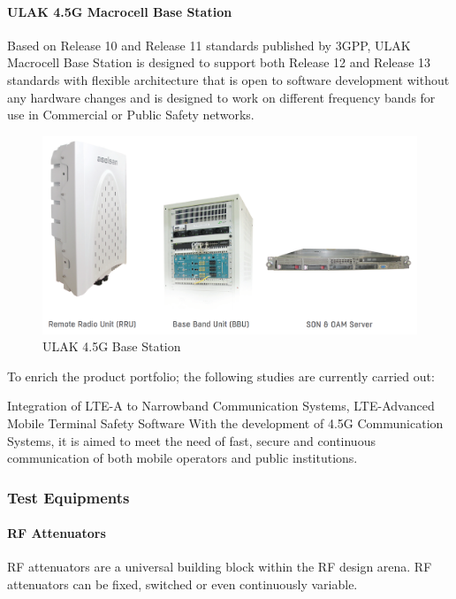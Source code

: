 \paragraph{ULAK 4.5G Macrocell Base Station}
\- \indent
	Based on Release 10 and Release 11 standards published by 3GPP, ULAK Macrocell Base Station is designed to support both Release 12 and Release 13 standards with flexible architecture that is open to software development without any hardware changes and is designed to work on different frequency bands for use in Commercial or Public Safety networks.  

\begin{figure}[H]
	\center
	\setlength{\unitlength}{\textwidth} 
	\includegraphics[width=1.0\unitlength]{ulak}
	\caption{\label{fig:ulak}ULAK 4.5G Base Station }
\end{figure}	
	
	To enrich the product portfolio; the following studies are currently carried out:

	Integration of LTE-A to Narrowband Communication Systems,
LTE-Advanced Mobile Terminal Safety Software  
With the development of 4.5G Communication Systems, it is aimed to meet the need of fast, secure and continuous communication of both mobile operators and public institutions.


\vfill

\subsubsection{Test Equipments} 

\paragraph{RF Attenuators}

	RF attenuators are a universal building block within the RF design arena. RF attenuators can be fixed, switched or even continuously variable.


